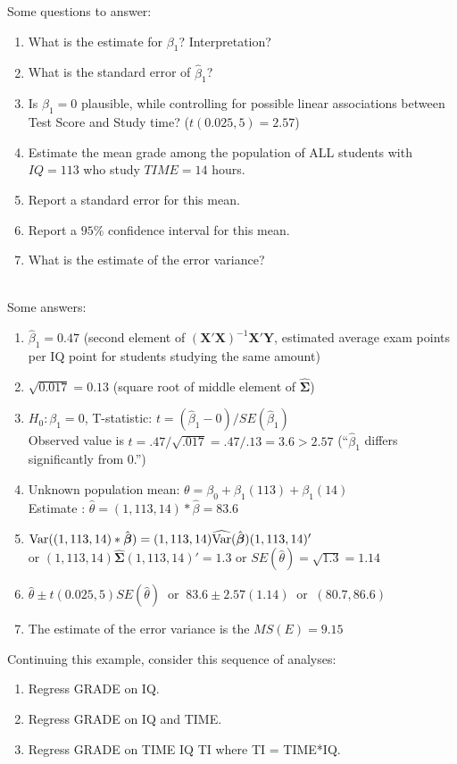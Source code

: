 Some questions to answer:
\begin{enumerate}
\item What is the estimate for $\beta_1$?  Interpretation? 
\item What is the standard error of $\hat\beta_1$?  
\item Is $\beta_1=0$ plausible, while controlling for possible linear associations between Test Score and Study time? ($t(0.025,5)=2.57$) 
\item Estimate the mean grade among the population of ALL students with $IQ=113$ who study $TIME=14$ hours.
\item Report a standard error for this mean.
\item Report a $95\%$ confidence interval for this mean.
\item What is the estimate of the error variance?
\end{enumerate}
~\\
Some answers:
\begin{enumerate}
\item $\hat\beta_1 =0.47$ (second element of $(\textbf{X}'\textbf{X})^{-1} \textbf{X}'\textbf{Y}$, estimated average exam points per IQ point for students studying the same amount)
\item $\sqrt{0.017}=0.13$ (square root of middle element of $\widehat{\boldsymbol{\Sigma}}$)
\item $H_0: \beta_1=0$, T-statistic: $t=(\hat\beta_1 - 0)/SE(\hat\beta_1)$ \\
Observed value is $t=.47/\sqrt{.017} = .47/.13=3.6 > 2.57$ (``$\hat\beta_1$ differs significantly from 0.'')
\item Unknown population mean: $\theta=\beta_0+\beta_1(113) +\beta_1(14)$ \\
Estimate : $\hat\theta=(1,113,14)* \hat\beta = 83.6$
\item $\mbox{Var}((1,113,14) * \hat{\boldsymbol{\beta}}) = (1,113,14)\widehat{\mbox{Var}}(\hat{\boldsymbol{\beta}}) (1,113,14)'$\\
or $(1,113,14)\widehat{\boldsymbol{\Sigma}} (1,113,14)'=1.3$ or $SE(\hat\theta) = \sqrt{1.3}=1.14$
\item $\hat\theta \pm t(0.025,5) SE(\hat\theta) \ \mbox{ or } \ 83.6 \pm { 2.57} (1.14) \ \mbox{ or } \ (80.7, 86.6)$
\item The estimate of the error variance is the $MS(E)=9.15$
\end{enumerate}

\newpage

Continuing this example, consider this sequence of analyses: 
\begin{enumerate}
\item Regress GRADE on IQ. 
\item Regress GRADE on IQ and TIME. 
\item Regress GRADE on TIME IQ TI where TI = TIME*IQ. 
\end{enumerate}

